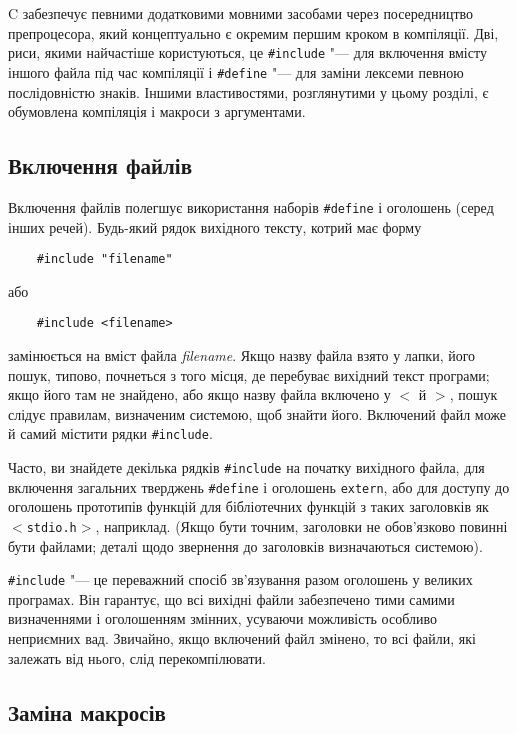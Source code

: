 \documentclass[a4paper,12pt]{book}
\begin{document}
\label{f0:ch4.11}
  C забезпечує певними додатковими мовними засобами через посередництво препроцесора, який
  концептуально є окремим першим кроком в компіляції. Дві, риси, якими найчастіше
  користуються, це \texttt{\#include} "--- для включення вмісту іншого файла під час
  компіляції і \texttt{\#define} "--- для заміни лексеми певною послідовністю знаків.
  Іншими властивостями, розглянутими у цьому розділі, є обумовлена компіляція і
  макроси з аргументами.

\subsection{Включення файлів}


  Включення файлів полегшує використання наборів \texttt{\#define} і оголошень (серед інших
  речей). Будь-який рядок вихідного тексту, котрий має форму
  \begin{verbatim}
    #include "filename"
  \end{verbatim}
  або
  \begin{verbatim}
    #include <filename>
  \end{verbatim}
  замінюється на вміст файла \textit{filename}. Якщо назву файла взято у лапки, його пошук,
  типово, почнеться з того місця, де перебуває вихідний текст програми; якщо його там не
  знайдено, або якщо назву файла включено у \texttt{\mbox{$<$}} й \texttt{\mbox{$>$}}, пошук слідує
  правилам, визначеним системою, щоб знайти його. Включений файл може й самий містити
  рядки \texttt{\#include}.

  Часто, ви знайдете декілька рядків \texttt{\#include} на початку вихідного файла, для
  включення загальних тверджень \texttt{\#define} і оголошень \texttt{extern}, або для
  доступу до оголошень прототипів функцій для бібліотечних функцій з таких заголовків як
  \texttt{\mbox{$<$}stdio.h\mbox{$>$}}, наприклад. (Якщо бути точним, заголовки не обов'язково повинні
  бути файлами; деталі щодо звернення до заголовків визначаються системою).

  \texttt{\#include} "--- це переважний спосіб зв'язування разом оголошень у великих
  програмах. Він гарантує, що всі вихідні файли забезпечено тими самими визначеннями і
  оголошенням змінних, усуваючи можливість особливо неприємних вад. Звичайно, якщо
  включений файл змінено, то всі файли, які залежать від нього, слід перекомпілювати.

\subsection{Заміна макросів}
\end{document}

